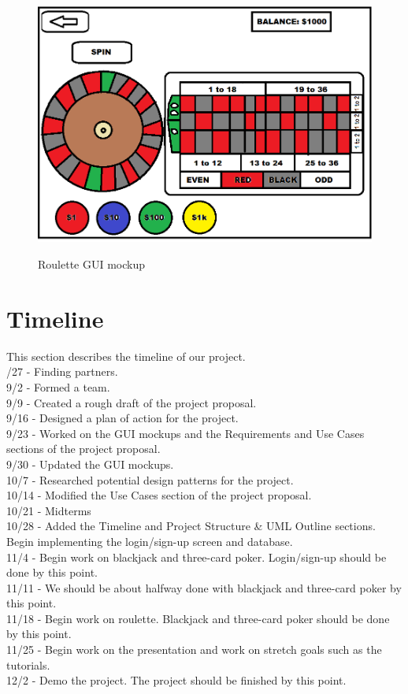 \documentclass[10pt,conference,onecolumn,compsoc]{IEEEtran}
\begin{document}
\begin{figure}[h]
\caption{Roulette GUI mockup}
\includegraphics[scale=0.4]{roulette}
\label{fig:roulette}
\centering
\end{figure}

\newpage

\section{Timeline}
This section describes the timeline of our project.\\
/27 - Finding partners.\\
9/2 - Formed a team.\\
9/9 - Created a rough draft of the project proposal.\\
9/16 - Designed a plan of action for the project.\\
9/23 - Worked on the GUI mockups and the Requirements and Use Cases sections of the project proposal.\\
9/30 - Updated the GUI mockups.\\
10/7 - Researched potential design patterns for the project.\\
10/14 - Modified the Use Cases section of the project proposal.\\
10/21 - Midterms\\
10/28 - Added the Timeline and Project Structure \& UML Outline sections. Begin implementing the login/sign-up screen and database.\\
11/4 - Begin work on blackjack and three-card poker. Login/sign-up should be done by this point.\\
11/11 - We should be about halfway done with blackjack and three-card poker by this point.\\
11/18 - Begin work on roulette. Blackjack and three-card poker should be done by this point.\\
11/25 - Begin work on the presentation and work on stretch goals such as the tutorials.\\
12/2 - Demo the project. The project should be finished by this point.\\
\end{document}
